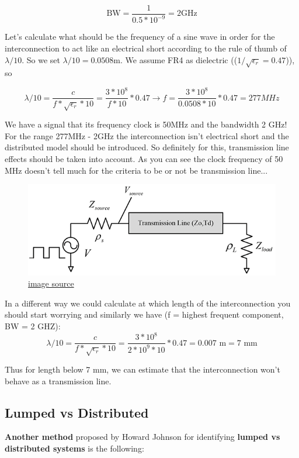 \documentclass[final]{cubedoc}
\begin{document}
	\[\text{BW} = \frac{1}{0.5 * 10^{-9}} = 2 \text{GHz}\]
	
	Let's calculate what should be the frequency of a sine wave in order for the interconnection to act like an electrical short according to the rule of thumb of $\lambda/10$. So we set $\lambda/10 = 0.0508 \text{m}$. We assume FR4 as dielectric (($1/\sqrt{\epsilon_r} = 0.47$)), so
	
	\[\lambda/10 = \frac{c}{f * \sqrt{\epsilon_r} * 10} = \frac{3 * 10^8}{f * 10} * 0.47 \rightarrow f = \frac{3 * 10^8}{0.0508 * 10} * 0.47 = 277 MHz \]
	
	We have a signal that its frequency clock is 50MHz and the bandwidth 2 GHz! For the range 277MHz - 2GHz the interconnection isn't electrical short and the distributed model should be introduced. So definitely for this, transmission line effects should be taken into account. As you can see the clock frequency of 50 MHz doesn't tell much for the criteria to be or not be transmission line... 
	
	\begin{figure}[h!]
		\centering
		\includegraphics[keepaspectratio, width = .8\textwidth]{assets/transmission_input.png}
		\caption{\href{https://web.archive.org/web/20200814093205/https://incompliancemag.com/article/an-overview-of-transmission-lines-in-electronic-systems/}{image source}}
	\end{figure}
	
	In a different way we could calculate at which length of the interconnection you should start worrying and similarly we have (f = highest frequent component, BW = 2 GHZ):
	\[\lambda/10 = \frac{c}{f * \sqrt{\epsilon_r} * 10} = \frac{3 * 10^8}{2*10^9 * 10} * 0.47 = 0.007 \text{ m} = 7 \text{ mm} \]
	
	Thus for length below 7 mm, we can estimate that the interconnection won't behave as a transmission line.
	
	\subsection{Lumped vs Distributed}
	\textbf{Another method} proposed by Howard Johnson for identifying \textbf{lumped vs distributed systems} is the following:
	
\end{document}

